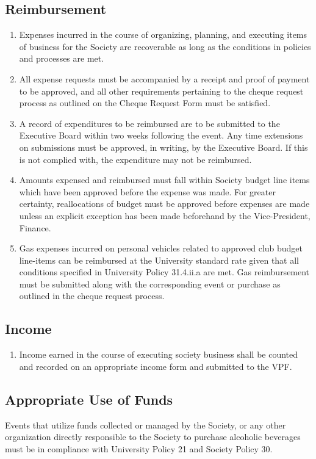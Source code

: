 \subsection{Reimbursement}
\begin{enumerate}
\item Expenses incurred in the course of organizing, planning, and executing items of business for the Society are recoverable as long as the conditions in policies and processes are met.
\item All expense requests must be accompanied by a receipt and proof of payment to be approved, and all other requirements pertaining to the cheque request process as outlined on the Cheque Request Form must be satisfied.
\item A record of expenditures to be reimbursed are to be submitted to the Executive Board within two weeks following the event. Any time extensions on submissions must be approved, in writing, by the Executive Board. If this is not complied with, the expenditure may not be reimbursed.
\item Amounts expensed and reimbursed must fall within Society budget line items which have been approved before the expense was made. For greater certainty, reallocations of budget must be approved before expenses are made unless an explicit exception has been made beforehand by the Vice-President, Finance.
\item Gas expenses incurred on personal vehicles related to approved club budget line-items can be reimbursed at the University standard rate given that all conditions specified in University Policy 31.4.ii.a are met. Gas reimbursement must be submitted along with the corresponding event or purchase as outlined in the cheque request process.
\end{enumerate}

\subsection{Income}
\begin{enumerate}
\item Income earned in the course of executing society business shall be counted and recorded on an appropriate income form and submitted to the VPF.
\end{enumerate}

\subsection{Appropriate Use of Funds}
Events that utilize funds collected or managed by the Society, or any other organization directly responsible to the Society to purchase alcoholic beverages must be in compliance with University Policy 21 and Society Policy 30.

